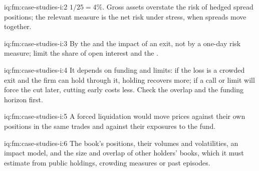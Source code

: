 \begin{solution}{iq:fm:case-studies-i:2}
$1/25=4\%$. Gross assets overstate the risk of hedged spread positions; the relevant measure is the net risk under stress, when spreads move together.
\end{solution}

\begin{solution}{iq:fm:case-studies-i:3}
By the  and the impact of an exit, not by a one-day risk measure; limit the share of open interest and the .
\end{solution}

\begin{solution}{iq:fm:case-studies-i:4}
It depends on funding and limits: if the loss is a crowded exit and the firm can hold through it, holding recovers more; if a call or limit will
force the cut later, cutting early costs less. Check the overlap and the funding horizon first.
\end{solution}

\begin{solution}{iq:fm:case-studies-i:5}
A forced liquidation would move prices against their own positions in the same trades and against their exposures to the fund.
\end{solution}

\begin{solution}{iq:fm:case-studies-i:6}
The book's positions, their volumes and volatilities, an impact model, and the size and overlap of other holders' books, which it must estimate from
public holdings, crowding measures or past episodes.
\end{solution}
